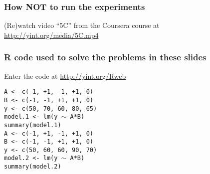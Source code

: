 \begin{frame}\frametitle{How \textbf{NOT} to run the experiments}
	(Re)watch  video ``5C'' from the Coursera course at \href{http://yint.org/media/5C.mp4}{http://yint.org/media/5C.mp4}
\end{frame}


\begin{frame}\frametitle{R code used to solve the problems in these slides}
	Enter the code at \href{http://yint.org/Rweb}{http://yint.org/Rweb}
	
	\vspace{12pt}
	
	\texttt{A <- c(-1,  +1,  -1,  +1,   0)}\\
	\texttt{B <- c(-1,  -1,  +1,  +1,   0)}\\
	\texttt{y <- c(50, 70, 60, 80, 65)}\\
	\texttt{model.1 <- lm(y $\sim$ A*B)} \\
	\texttt{summary(model.1)}\\
	
	\vspace{24pt}
	\texttt{A <- c(-1,  +1,  -1,  +1,   0)}\\
	\texttt{B <- c(-1,  -1,  +1,  +1,   0)}\\
	\texttt{y <- c(50, 60, 60, 90, 70)}\\
	\texttt{model.2 <- lm(y $\sim$ A*B)}\\
	\texttt{summary(model.2)}
	
\end{frame}

